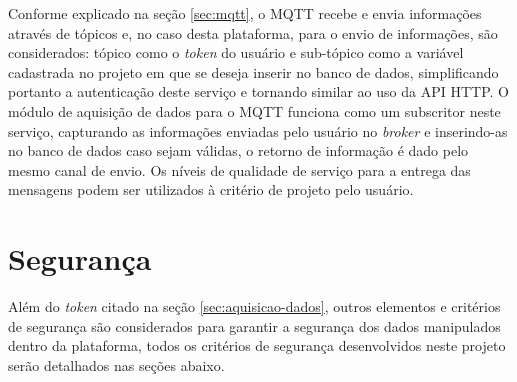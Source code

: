         \begin{figure}[!h]
    	\end{figure}
    	
    	Conforme explicado na seção \ref{sec:mqtt}, o MQTT recebe e envia informações através de tópicos e, no caso desta plataforma, para o envio de informações, são considerados: tópico como o \textit{token} do usuário e sub-tópico como a variável cadastrada no projeto em que se deseja inserir no banco de dados, simplificando portanto a autenticação deste serviço e tornando similar ao uso da \gls{API} \gls{HTTP}. O módulo de aquisição de dados para o MQTT funciona como um subscritor neste serviço, capturando as informações enviadas pelo usuário no \textit{broker} e inserindo-as no banco de dados caso sejam válidas, o retorno de informação é dado pelo mesmo canal de envio. Os níveis de qualidade de serviço para a entrega das mensagens podem ser utilizados à critério de projeto pelo usuário.

\section{Segurança}
    \label{sec:seguranca}
    Além do \textit{token} citado na seção \ref{sec:aquisicao-dados}, outros elementos e critérios de segurança são considerados para garantir a segurança dos dados manipulados dentro da plataforma, todos os critérios de segurança desenvolvidos neste projeto serão detalhados nas seções abaixo.
        
